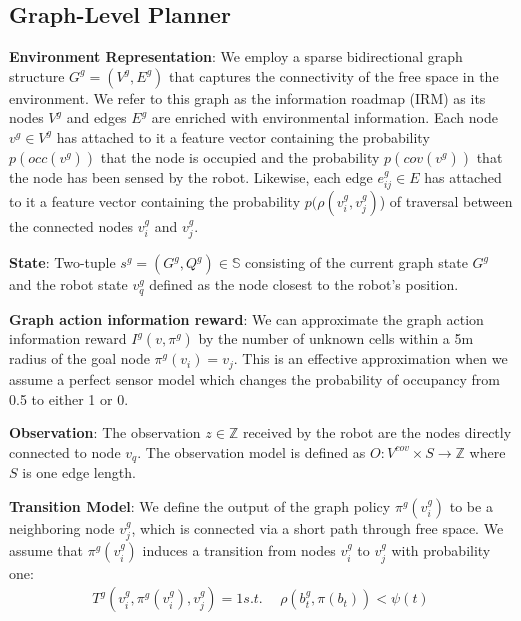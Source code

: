 \documentclass[letterpaper]{article} %
\newcommand{\ph}[1]{{\textbf{#1}:}} %
\begin{document}





\subsection{Graph-Level Planner} 


\ph{Environment Representation} We employ a sparse bidirectional graph structure $G^g = (V^g, E^g)$ that captures the connectivity of the free space in the environment. We refer to this graph as the information roadmap (IRM) as its nodes $V^g$ and edges $E^g$ are enriched with environmental information. Each node $v^g \in V^g$ has attached to it a feature vector containing the probability $p(occ(v^g))$ that the node is occupied and the probability $p(cov(v^g))$ that the node has been sensed by the robot. Likewise, each edge $e_{ij}^g \in E$ has attached to it a feature vector containing the probability $p(\rho(v_i^g, v_j^g)$) of traversal between the connected nodes $v_i^g$ and $v_j^g$.

\ph{State} Two-tuple $s^g=(G^g, Q^g) \in \mathbb{S}$ consisting of the current graph state $G^g$ and the robot state $v_q^g$ defined as the node closest to the robot's position. 

\ph{Graph action information reward}
We can approximate the graph action information reward $I^g(v, \pi^g)$ by the number of unknown cells within a 5m radius of the goal node $\pi^g(v_i)=v_j$.  This is an effective approximation when we assume a perfect sensor model which changes the probability of occupancy from 0.5 to either 1 or 0.  

\ph{Observation} The observation $z \in \mathbb{Z}$ received by the robot are the nodes directly connected to node $v_q$. The observation model is defined as $O: V^{cov} \times S \rightarrow \mathbb{Z}$ where $S$ is one edge length.


\ph{Transition Model} We define the output of the graph policy $\pi^g(v_i^g)$ to be a neighboring node $v_j^g$, which is connected via a short path through free space. We assume that $\pi^{g}(v_i^g)$ induces a transition from nodes $v_i^g$ to $v_j^g$ with probability one:
\begin{align}
    T^{g} (v_i^g, \pi^g(v_i^g), v_j^g) = 1
    s.t.~&~\rho(b_t^g,\pi(b_t)) < \psi(t)
\end{align}
\end{document}
